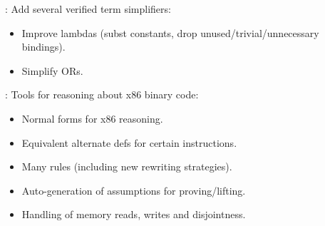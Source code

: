 
\begin{frame}

\implibtitle

:
Add several verified term simplifiers:
\begin{itemize}
\item Improve lambdas
      (subst constants, drop unused/trivial/unnecessary bindings).
\item Simplify ORs.
\end{itemize}

\end{frame}


\begin{frame}

\implibtitle

:
Tools for reasoning about x86 binary code:
\begin{itemize}
\item Normal forms for x86 reasoning.
\item Equivalent alternate defs for certain instructions.
\item Many rules (including new rewriting strategies).
\item Auto-generation of assumptions for proving/lifting.
\item Handling of memory reads, writes and disjointness.
\end{itemize}

\end{frame}


